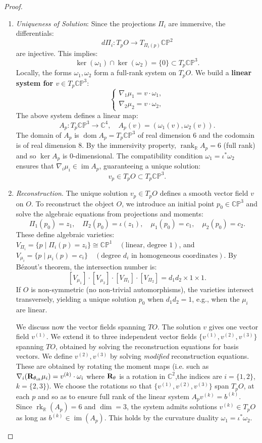 \documentclass[runningheads]{llncs}
\begin{document}
\begin{proof}
\begin{enumerate}
    \item {\it Uniqueness of Solution}:
Since the projections $\Pi_i$ are immersive, the differentials:
\[
d\Pi_i : T_p O \to T_{\Pi_i(p)} \mathbb{CP}^2
\]
are injective. This implies:
\[
\ker(\omega_1) \cap \ker(\omega_2) = \{ 0 \} \subset T_p \mathbb{CP}^3.
\]
Locally, the forms $\omega_1, \omega_2$ form a full-rank system on $T_p O$. We  build a \textbf{linear system for $v\in T_p \mathbb{CP}^3$}:
\[
\begin{cases}
\nabla_1 \mu_1 = v \cdot \omega_1, \\
\nabla_2 \mu_2 = v \cdot \omega_2,
\end{cases}
\]
The above system defines a linear map:
\[
A_p : T_p \mathbb{CP}^3 \to \mathbb{C}^4, \quad A_p(v) = \left( \omega_1(v), \omega_2(v) \right).
\]
The domain of $A_p$ is $\operatorname{dom} A_p = T_p \mathbb{CP}^3$ of real dimension 6 and the codomain is of real dimension $8$. By the immersivity property, $\operatorname{rank}_\mathbb{R} A_p = 6$ (full rank) and so $\ker A_p$ is 0-dimensional. The compatibility condition $\omega_1 = \iota^* \omega_2$ ensures that $\nabla_i \mu_i \in \operatorname{im} A_p$, guaranteeing a unique solution:
\[
v_p \in T_p O \subset T_p \mathbb{CP}^3.
\]
  \item {\it Reconstruction}. The unique solution $v_p\in T_pO$ defines a smooth vector field $v$ on $O$. To reconstruct the object $O$, we introduce an initial point $p_0 \in \mathbb{CP}^3$ and solve the algebraic equations from projections and moments:
\[
\Pi_1(p_0) = z_1, \quad \Pi_2(p_0) = \iota(z_1),\quad
\mu_1(p_0) = c_1, \quad \mu_2(p_0) = c_2.
\]
These define algebraic varieties:
$V_{\Pi_i} = \{ p \mid \Pi_i(p) = z_i \} \cong \mathbb{CP}^1 \quad (\text{linear, degree 1})$,
and $V_{\mu_i} = \{ p \mid \mu_i(p) = c_i \} \quad (\text{degree } d_i \text{ in homogeneous coordinates}).$
By Bézout’s theorem, the intersection number is:
\[
[V_{\mu_1}] \cdot [V_{\mu_2}] \cdot [V_{\Pi_1}] \cdot [V_{\Pi_2}] = d_1 d_2 \times 1 \times 1.
\]
If $O$ is non-symmetric (no non-trivial automorphisms), the varieties intersect transversely, yielding a unique solution $p_0$ when $d_1 d_2 = 1$, e.g., when the $\mu_i$ are linear.

\medskip 

We discuss now the vector fields spanning $TO$.  The solution $v$ gives one vector field $v^{(1)}$. We extend it to three independent vector fields $\{v^{(1)}, v^{(2)}, v^{(3)}\}$ spanning $TO$, obtained by solving the reconstruction equations for basis vectors. We define $ v^{(2)}, v^{(3)}$ by solving {\it modified} reconstruction equations. These are obtained by rotating the moment maps (i.e. such as $\nabla_i({\bf R}_{\theta_{ik}}\mu_i)=v^{(k)}\cdot \omega_i$ where ${\bf R}_{\theta}$ is a rotation in $\mathbb{C}^2$,the indices are $i=\{1,2\}$, $k=\{2,3\}$). We choose the rotations so that $\{v^{(1)}, v^{(2)}, v^{(3)}\}$ span $T_pO$, at each $p$ and so as to ensure full rank of the linear system $A_pv^{(k)}=b^{(k)}$. Since $\operatorname{rk}_{\mathbb{R}}(A_p)=6$ and $\operatorname{dim}=3$, the system admits solutions $v^{(k)}\in T_pO$ as long as $b^{(k)}\in  \operatorname{im}(A_p)$. This holds by the curvature duality $\omega_1=\iota^*\omega_2$.


\end{enumerate}
\end{proof}
\end{document}

